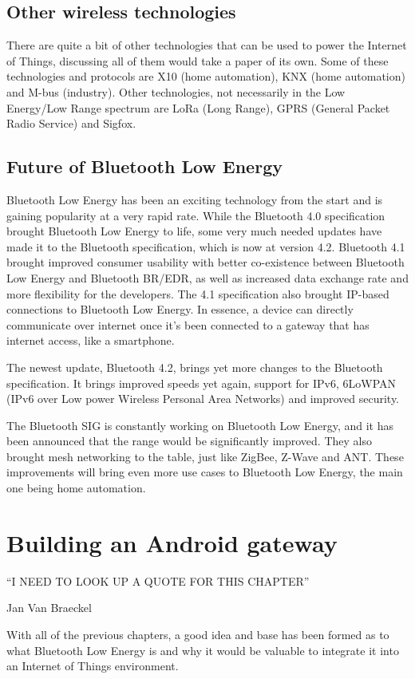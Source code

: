 \documentclass[pdftex,a4paper,12pt,twoside]{report}
\begin{document}
\section{Other wireless technologies}
\label{sec:othertechnologies}
There are quite a bit of other technologies that can be used to power the Internet of Things, discussing all of them would take a paper of its own. Some of these technologies and protocols are X10 (home automation), KNX (home automation) and M-bus (industry). Other technologies, not necessarily in the Low Energy/Low Range spectrum are LoRa (Long Range), GPRS (General Packet Radio Service) and Sigfox.

\section{Future of Bluetooth Low Energy}
\label{sec:futureble}
Bluetooth Low Energy has been an exciting technology from the start and is gaining popularity at a very rapid rate. While the Bluetooth 4.0 specification brought Bluetooth Low Energy to life, some very much needed updates have made it to the Bluetooth specification, which is now at version 4.2. Bluetooth 4.1 brought improved consumer usability with better co-existence between Bluetooth Low Energy and Bluetooth BR/EDR, as well as increased data exchange rate and more flexibility for the developers. The 4.1 specification also brought IP-based connections to Bluetooth Low Energy. In essence, a device can directly communicate over internet once it's been connected to a gateway that has internet access, like a smartphone.

The newest update, Bluetooth 4.2, brings yet more changes to the Bluetooth specification. It brings improved speeds yet again, support for IPv6, 6LoWPAN (IPv6 over Low power Wireless Personal Area Networks) and improved security.

The Bluetooth SIG is constantly working on Bluetooth Low Energy, and it has been announced that the range would be significantly improved. They also brought mesh networking to the table, just like ZigBee, Z-Wave and ANT. These improvements will bring even more use cases to Bluetooth Low Energy, the main one being home automation.

\chapter{Building an Android gateway}
\label{ch:android}
\epigraph{``I NEED TO LOOK UP A QUOTE FOR THIS CHAPTER''}{Jan Van Braeckel}
With all of the previous chapters, a good idea and base has been formed as to what Bluetooth Low Energy is and why it would be valuable to integrate it into an Internet of Things environment.
\end{document}
